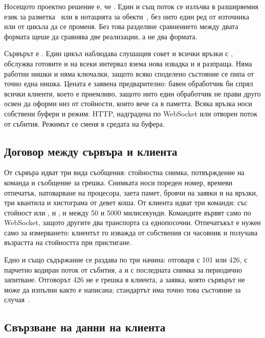 Носещото проектно решение е, че .
Един и същ поток се излъчва в разширяемия език за разметка~\cite{xml10} или в нотацията за
обекти~\cite{rfc8259}, без нито един ред от източника или от цикъла да се променя. Без това
разделяне сравнението между двата формата щеше да сравнява две реализации, а не два формата.

Сървърът е . Един цикъл наблюдава слушащия сокет и всички връзки с
, обслужва готовите и на всеки интервал взема нова извадка и я разпраща. Няма
работни нишки и няма ключалки, защото всяко споделено състояние се пипа от точно една нишка.
Цената е заявена предварително: бавен обработчик би спрял всички клиенти, което е приемливо,
защото нито един обработчик не прави друго освен да оформи низ от стойности, които вече са в
паметта. Всяка връзка носи собствени буфери и режим: HTTP, надградена по WebSocket или отворен
поток от събития. Режимът се сменя в средата на буфера.

\subsection{Договор между сървъра и клиента}

От сървъра идват три вида съобщения: стойностна снимка, потвърждение на команда и съобщение
за грешка. Снимката носи пореден номер, времеви отпечатък, натоварване на процесора, заета
памет, броячи на заявки и на връзки, три квантила и хистограма от девет коша. От клиента идват
три команди:  със стойност  или ,  и
, и  между 50 и 5000 милисекунди. Командите вървят само по
WebSocket, защото другите два транспорта са еднопосочни. Отпечатъкът е нужен само за
измерването: клиентът го изважда от собствения си часовник и получава възрастта на стойността
при пристигане.

Едно и също съдържание се раздава по три начина:  отговаря с 101 или 426,
 с парчетно кодиран поток от събития, а  и
 с последната снимка за периодично запитване. Отговорът 426 не е грешка
в клиента, а заявка, която сървърът не може да изпълни както е написана; стандартът има точно
това състояние за случая~\cite{rfc9110}.

\subsection{Свързване на данни на клиента}

